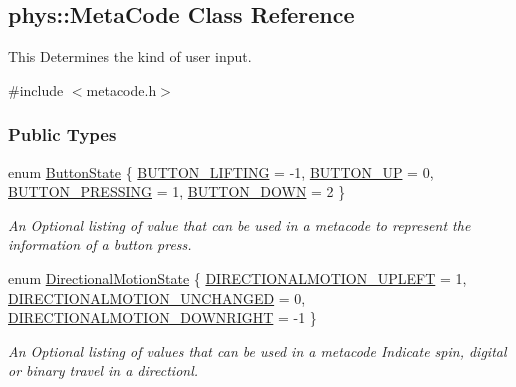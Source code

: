 \hypertarget{classphys_1_1MetaCode}{
\subsection{phys::MetaCode Class Reference}
\label{classphys_1_1MetaCode}
}


This Determines the kind of user input.  




{\ttfamily \#include $<$metacode.h$>$}

\subsubsection*{Public Types}
\begin{DoxyCompactItemize}
\item 
enum \hyperlink{classphys_1_1MetaCode_a2fdfb26b3e50ceb0ccc60bfc4c3d6ac2}{ButtonState} \{ \hyperlink{classphys_1_1MetaCode_a2fdfb26b3e50ceb0ccc60bfc4c3d6ac2a6b5564408703517f36debd8c423e2dee}{BUTTON\_\-LIFTING} =  -\/1, 
\hyperlink{classphys_1_1MetaCode_a2fdfb26b3e50ceb0ccc60bfc4c3d6ac2ae275c52779b0f6ec37533af256a70cc3}{BUTTON\_\-UP} =  0, 
\hyperlink{classphys_1_1MetaCode_a2fdfb26b3e50ceb0ccc60bfc4c3d6ac2a33669b2b9ca814664296da55702e412d}{BUTTON\_\-PRESSING} =  1, 
\hyperlink{classphys_1_1MetaCode_a2fdfb26b3e50ceb0ccc60bfc4c3d6ac2a5b52ee1db94dbc2db23f3b4c267b5438}{BUTTON\_\-DOWN} =  2
 \}
\begin{DoxyCompactList}\small\item\em An Optional listing of value that can be used in a metacode to represent the information of a button press. \item\end{DoxyCompactList}\item 
enum \hyperlink{classphys_1_1MetaCode_ad6ed6266b5f4219a6f5da29ebe018757}{DirectionalMotionState} \{ \hyperlink{classphys_1_1MetaCode_ad6ed6266b5f4219a6f5da29ebe018757ae4b09c3b8e79b189d9fbc2ea8a1bcade}{DIRECTIONALMOTION\_\-UPLEFT} =  1, 
\hyperlink{classphys_1_1MetaCode_ad6ed6266b5f4219a6f5da29ebe018757a01bfdb29aaa2cb816b704667d5cc348f}{DIRECTIONALMOTION\_\-UNCHANGED} =  0, 
\hyperlink{classphys_1_1MetaCode_ad6ed6266b5f4219a6f5da29ebe018757af4a101f9bcd1baedca43bacd3845eb41}{DIRECTIONALMOTION\_\-DOWNRIGHT} =  -\/1
 \}
\begin{DoxyCompactList}\small\item\em An Optional listing of values that can be used in a metacode Indicate spin, digital or binary travel in a directionl. \item\end{DoxyCompactList}\item 

\end{DoxyCompactItemize}
